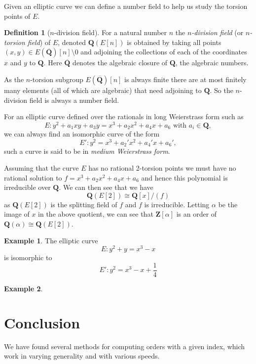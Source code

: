 \documentclass[12pt,a4paper,abstracton,bibtotoc]{scrreprt}
\theoremstyle{definition}
\newtheorem{defn}{Definition}
\newtheorem{ex}{Example}
\newcommand{\QQ}{\mathbf{Q}}
\newcommand{\ZZ}{\mathbf{Z}}
\begin{document}
Given an elliptic curve we can define a number field to help us study the torsion points of $E$.

\begin{defn}[$n$-division field] %
For a natural number $n$ the \emph{$n$-division field} (or \emph{$n$-torsion field}) of $E$, denoted $\QQ(E[n])$ is obtained by taking all points $(x,y) \in E(\overline{\QQ})[n]\setminus 0$ and adjoining the collections of each of the coordinates $x$ and $y$ to $\QQ$.
Here $\overline{\QQ}$ denotes the algebraic closure of $\QQ$, the algebraic numbers. %
\end{defn}
As the $n$-torsion subgroup $E(\overline{\QQ})[n]$ is always finite there are at most finitely many elements (all of which are algebraic) that need adjoining to $\QQ$.
So the $n$-division field is always a number field. %

For an elliptic curve defined over the rationals in long Weierstrass form such as
\[
E \colon y^2 + a_1xy + a_3y = x^3 + a_2x^2 + a_4x + a_6\text{ with }a_i \in \QQ,
\]
we can always find an isomorphic curve of the form
\[
E' \colon y^2 = x^3 + a_2'x^2 + a_4'x + a_6',
\]
such a curve is said to be in \emph{medium Weierstrass form}.

\minisec{}
Assuming that the curve $E$ has no rational 2-torsion points we must have no rational solution to $f = x^3 + a_2x^2 + a_4x + a_6$ and hence this polynomial is irreducible over $\QQ$.
We can then see that we have
\[
\QQ(E[2]) \cong \QQ[x]/(f)
\]
as $\QQ(E[2])$ is the splitting field of $f$ and $f$ is irreducible. %
Letting $\alpha$ be the image of $x$ in the above quotient, we can see that $ \ZZ[\alpha]$ is an order of $\QQ(\alpha)\cong \QQ(E[2])$.


\begin{ex}
The elliptic curve
\[
E\colon y^2 + y = x^3 - x
\]
is isomorphic to
\[
E'\colon y^2 = x^3 - x + \frac{1}{4}
\]
\end{ex}

\begin{ex}
\end{ex}

\chapter{Conclusion}
We have found several methods for computing orders with a given index, which work in varying generality and with various speeds.
\end{document}

